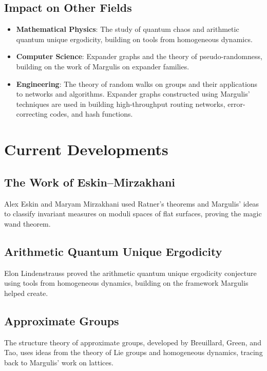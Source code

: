 \subsection{Impact on Other Fields}

\begin{itemize}
\item \textbf{Mathematical Physics}: The study of quantum chaos and arithmetic quantum unique ergodicity, building on tools from homogeneous dynamics.
\item \textbf{Computer Science}: Expander graphs and the theory of pseudo-randomness, building on the work of Margulis on expander families.
\item \textbf{Engineering}: The theory of random walks on groups and their applications to networks and algorithms. Expander graphs constructed using Margulis' techniques are used in building high-throughput routing networks, error-correcting codes, and hash functions.
\end{itemize}

\section{Current Developments}

\subsection{The Work of Eskin--Mirzakhani}

Alex Eskin and Maryam Mirzakhani used Ratner's theorems and Margulis' ideas to classify invariant measures on moduli spaces of flat surfaces, proving the magic wand theorem.

\subsection{Arithmetic Quantum Unique Ergodicity}

Elon Lindenstrauss proved the arithmetic quantum unique ergodicity conjecture using tools from homogeneous dynamics, building on the framework Margulis helped create.

\subsection{Approximate Groups}

The structure theory of approximate groups, developed by Breuillard, Green, and Tao, uses ideas from the theory of Lie groups and homogeneous dynamics, tracing back to Margulis' work on lattices.

